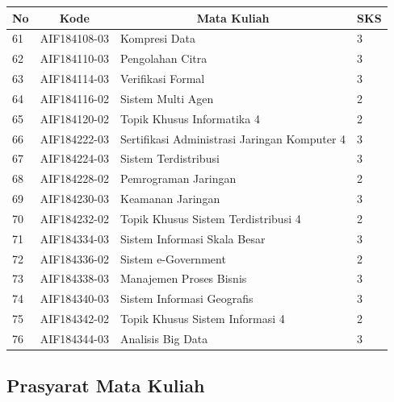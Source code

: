 \begin{table}[H]
	\centering
		\begin{tabular}{|p{0.5cm}|p{2.85cm}|p{4.95cm}|p{2.7cm}|}
			\hline
			\multicolumn{1}{|c|}{\textbf{No}} & \multicolumn{1}{c|}{\textbf{Kode}} & \multicolumn{1}{c|}{\textbf{Mata Kuliah}} & \multicolumn{1}{c|}{\textbf{SKS}} \\ \hline
61 & AIF184108-03 & Kompresi Data                                & 3 \\ \hline
62 & AIF184110-03 & Pengolahan Citra                             & 3 \\ \hline
63 & AIF184114-03 & Verifikasi Formal                            & 3 \\ \hline
64 & AIF184116-02 & Sistem Multi Agen                            & 2 \\ \hline
65 & AIF184120-02 & Topik Khusus Informatika 4                   & 2 \\ \hline
66 & AIF184222-03 & Sertifikasi Administrasi Jaringan Komputer 4 & 3 \\ \hline
67 & AIF184224-03 & Sistem Terdistribusi                         & 3 \\ \hline
68 & AIF184228-02 & Pemrograman Jaringan                         & 2 \\ \hline
69 & AIF184230-03 & Keamanan Jaringan                            & 3 \\ \hline
70 & AIF184232-02 & Topik Khusus Sistem Terdistribusi 4          & 2 \\ \hline
71 & AIF184334-03 & Sistem Informasi Skala Besar                 & 3 \\ \hline
72 & AIF184336-02 & Sistem e-Government                          & 2 \\ \hline
73 & AIF184338-03 & Manajemen Proses Bisnis                      & 3 \\ \hline
74 & AIF184340-03 & Sistem Informasi Geografis                   & 3 \\ \hline
75 & AIF184342-02 & Topik Khusus Sistem Informasi 4              & 2 \\ \hline
76 & AIF184344-03 & Analisis Big Data                            & 3 \\ \hline
		\end{tabular}
	\label{tab:kuliahpilihan_3}
\end{table}

\subsection{Prasyarat Mata Kuliah}

